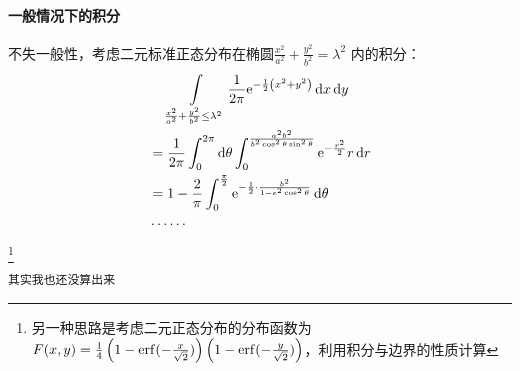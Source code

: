 \paragraph{一般情况下的积分}
不失一般性，考虑二元标准正态分布在椭圆\(\frac{x^{2}}{a^{2}} +
\frac{y^{2}}{b^{2}} =\lambda^{2}\) 内的积分：
\begin{align*}
    &\placeholder{=} \int\limits_{\frac{x^{2}}{a^{2}} +
        \frac{y^{2}}{b^{2}} \leq
    \lambda^{2}} \frac{1}{2\pi} \e^{-\frac{1}{2}\left(
    x^{2}+y^{2} \right)}  \d{x} \d{y}\\
    &= \frac{1}{2\pi} \int_{0}^{2\pi} \d{\theta}
    \int_{0}^{\frac{a^{2}b^{2}}{b^{2}\cos^{2}\theta
    \sin^{2}\theta}} \e^{-\frac{r^{2}}{2}} r\d{r} \\
    &= 1- \frac{2}{\pi} \int_{0}^{\frac{\pi}{2}}
    \e^{-\frac{1}{2} \cdot
    \frac{b^{2}}{1-e^{2}\cos^{2}\theta}} \d{\theta}\\
    & \cdots \cdots
\end{align*}
\footnote{另一种思路是考虑二元正态分布的分布函数为\(F(x,y) = \frac{1}{4}
        \left(1- \mathrm{erf}(-\frac{x}{\sqrt{2}}) \right)\left( 1-
\mathrm{erf}(-\frac{y}{\sqrt{2}}) \right) \)，利用积分与边界的性质计算}

\texttt{其实我也还没算出来}
